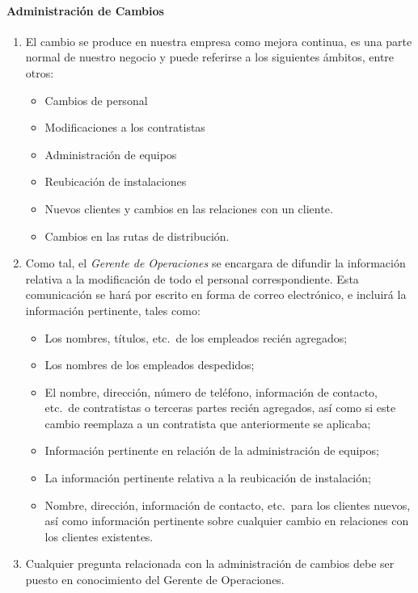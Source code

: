 \paragraph{Administración de Cambios}

\begin{enumerate}
\item El cambio se produce en nuestra empresa como mejora continua, es una parte normal de nuestro negocio y puede referirse a los siguientes ámbitos, entre otros:
\begin{itemize}
	\item Cambios de personal
	\item Modificaciones a los contratistas
	\item Administración de equipos
	\item Reubicación de instalaciones
	\item Nuevos clientes y cambios en las relaciones con un cliente.
	\item Cambios en las rutas de distribución.
\end{itemize}
\item Como tal, el \emph{Gerente de Operaciones} se encargara de difundir la información relativa a la modificación de todo el personal correspondiente. Esta comunicación se hará por escrito en forma de correo electrónico, e incluirá la información pertinente, tales como:
\begin{itemize}
	\item Los nombres, títulos, etc.\ de los empleados recién agregados;
	\item Los nombres de los empleados despedidos;
	\item El nombre, dirección, número de teléfono, información de contacto, etc.\ de contratistas o terceras partes recién agregados, así como si este cambio reemplaza a un contratista que anteriormente se aplicaba;
	\item Información pertinente en relación de la administración de equipos;
	\item La información pertinente relativa a la reubicación de instalación;
	\item Nombre, dirección, información de contacto, etc.\ para los clientes nuevos, así como información pertinente sobre cualquier cambio en relaciones con los clientes existentes.
\end{itemize}
	\item Cualquier pregunta  relacionada con la administración de cambios debe ser puesto en conocimiento del Gerente de Operaciones.
\end{enumerate}

